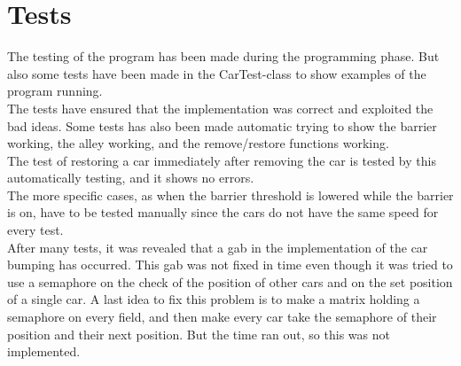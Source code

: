 \section{Tests}
The testing of the program has been made during the programming phase. But also some tests have been made in the CarTest-class to show examples of the program running. \\

The tests have ensured that the implementation was correct and exploited the bad ideas. Some tests has also been made automatic trying to show the barrier working, the alley working, and the remove/restore functions working. \\
The test of restoring a car immediately after removing the car is tested by this automatically testing, and it shows no errors.
\\

The more specific cases, as when the barrier threshold is lowered while the barrier is on, have to be tested manually since the cars do not have the same speed for every test. 
\\

After many tests, it was revealed that a gab in the implementation of the car bumping has occurred. This gab was not fixed in time even though it was tried to use a semaphore on the check of the position of other cars and on the set position of a single car. A last idea to fix this problem is to make a matrix holding a semaphore on every field, and then make every car take the semaphore of their position and their next position. But the time ran out, so this was not implemented.